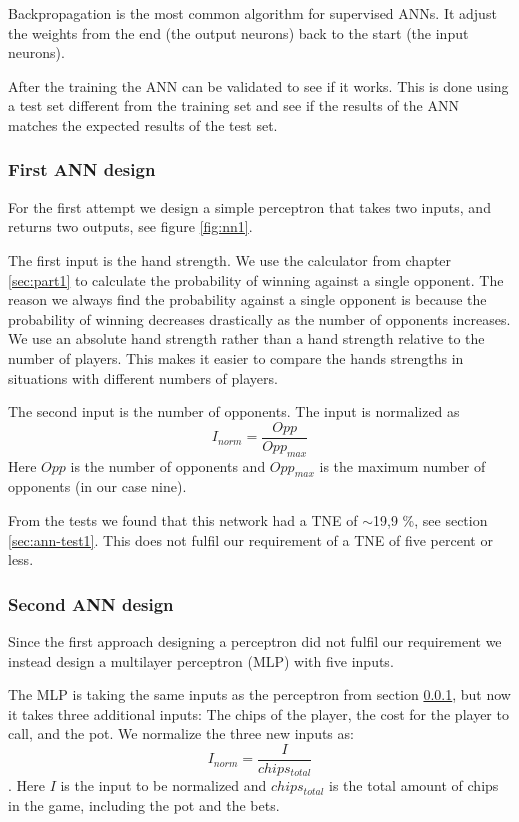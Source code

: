 Backpropagation is the most common algorithm for supervised ANNs. It adjust the weights from the end (the output neurons) back to the start (the input neurons).

After the training the ANN can be validated to see if it works. This is done using a test set different from the training set and see if the results of the ANN matches the expected results of the test set.

\subsubsection{First ANN design}
\label{sec:design1}
For the first attempt we design a simple perceptron that takes two inputs, and returns two outputs, see figure \ref{fig:nn1}. 


The first input is the hand strength. We use the calculator from chapter \ref{sec:part1} to calculate the probability of winning against a single opponent. The reason we always find the probability against a single opponent is because the probability of winning decreases drastically as the number of opponents increases. We use an absolute hand strength rather than a hand strength relative to the number of players. This makes it easier to compare the hands strengths in situations with different numbers of players. 

The second input is the number of opponents. The input is normalized as \[I_{norm} = \frac{Opp}{Opp_{max}}\] 
Here $Opp$ is the number of opponents and $Opp_{max}$ is the maximum number of opponents (in our case nine).

From the tests we found that this network had a TNE of $\sim$19,9 \%, see section \ref{sec:ann-test1}. This does not fulfil our requirement of a TNE of five percent or less.

\subsubsection{Second ANN design}
Since the first approach designing a perceptron did not fulfil our requirement we instead design a multilayer perceptron (MLP) with five inputs.

The MLP is taking the same inputs as the perceptron from section \ref{sec:design1}, but now it takes three additional inputs: The chips of the player, the cost for the player to call, and the pot. We normalize the three new inputs as: \[I_{norm} = \frac{I}{chips_{total}}\]. 
Here $I$ is the input to be normalized and $chips_{total}$ is the total amount of chips in the game, including the pot and the bets.

